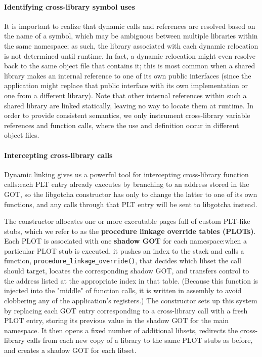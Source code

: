 \paragraph{Identifying cross-library symbol uses}

It is important to realize that dynamic calls and references are resolved based on
the name of a symbol, which may be ambiguous between multiple libraries within the
same namespace; as such, the library associated with each dynamic relocation is not
determined until runtime.  In fact, a dynamic relocation might even resolve back to
the same object file that contains it; this is most common when a shared library
makes an internal reference to one of its own public interfaces (since the
application might replace that public interface with its own implementation or one
from a different library).  Note that other internal references within such a shared
library are linked statically, leaving no way to locate them at runtime.  In order to
provide consistent semantics, we only instrument cross-library variable
references and function calls, where the use and definition occur in different object
files.


\paragraph{Intercepting cross-library calls}

Dynamic linking gives us a powerful tool for intercepting cross-library function
calls:\@ each PLT entry already executes by branching to an address stored in the
GOT, so the libgotcha constructor has only to change the latter to one of its own
functions, and any calls through that PLT entry will be sent to libgotcha instead.

The constructor allocates one or more executable pages full of custom PLT-like
stubs, which we refer to as the \textbf{procedure linkage override tables (PLOTs)}.
Each PLOT is associated with one \textbf{shadow GOT} for each namespace:\@ when a
particular PLOT stub is executed, it pushes an index to the stack and calls a
function, \texttt{procedure\_linkage\_override()}, that decides which libset the call
should target, locates the corresponding shadow GOT, and transfers control to the
address listed at the appropriate index in that table.  (Because this function
is injected into the "middle" of function calls, it is written in assembly to avoid
clobbering any of the application's registers.)  The constructor sets up this system
by replacing each GOT entry corresponding to a cross-library call with a fresh PLOT
entry, storing its previous value in the shadow GOT for the main namespace.  It then
opens a fixed number of additional libsets, redirects the cross-library calls from
each new copy of a library to the same PLOT stubs as before, and creates a shadow GOT
for each libset.

